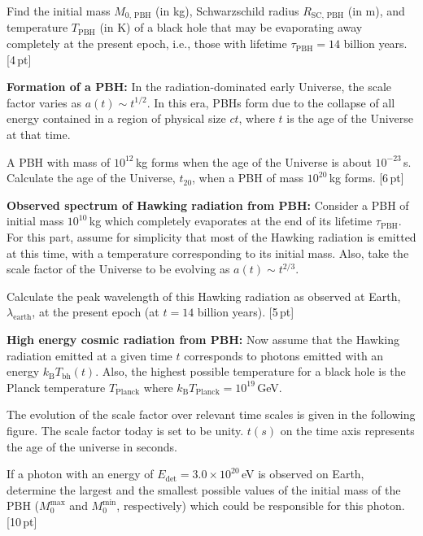 \begin{description}
\begin{description}
    Find the initial mass $M_{0,\,\mathrm{PBH}}$ (in kg), Schwarzschild radius
    $R_{\mathrm{SC},\,\mathrm{PBH}}$ (in m), and temperature
    $T_{\mathrm{PBH}}$ (in K) of a black hole that may be evaporating away
    completely at the present epoch, i.e., those with lifetime
    $\tau_{\mathrm{PBH}} = 14$ billion years. \hfill[4\,pt]
  \item[(T12.2b)] \textbf{Formation of a PBH:} In the radiation-dominated
    early Universe, the scale factor varies as $a(t) \sim t^{1/2}$. In this
    era, PBHs form due to the collapse of all energy contained in a region of
    physical size $ct$, where $t$ is the age of the Universe at that time.

    A PBH with mass of $10^{12}$\,kg forms when the age of the Universe is
    about $10^{-23}$\,s. Calculate the age of the Universe, $t_{20}$, when a
    PBH of mass $10^{20}$\,kg forms. \hfill[6\,pt]
  \item[(T12.2c)] \textbf{Observed spectrum of Hawking radiation from PBH:}
    Consider a PBH of initial mass $10^{10}$\,kg which completely evaporates
    at the end of its lifetime $\tau_{\mathrm{PBH}}$. For this part, assume
    for simplicity that most of the Hawking radiation is emitted at this time,
    with a temperature corresponding to its initial mass. Also, take the scale
    factor of the Universe to be evolving as $a(t) \sim t^{2/3}$.

    Calculate the peak wavelength of this Hawking radiation as observed at
    Earth, $\lambda_{\mathrm{earth}}$, at the present epoch (at $t = 14$
    billion years). \hfill[5\,pt]
  \item[(T12.2d)] \textbf{High energy cosmic radiation from PBH:} Now assume
    that the Hawking radiation emitted at a given time $t$ corresponds to
    photons emitted with an energy $k_{\mathrm{B}}T_{\mathrm{bh}}(t)$. Also,
    the highest possible temperature for a black hole is the Planck
    temperature $T_{\mathrm{Planck}}$ where
    $k_{\mathrm{B}}T_{\mathrm{Planck}} = 10^{19}$\,GeV.

    The evolution of the scale factor over relevant time scales is given in
    the following figure. The scale factor today is set to be unity. $t(s)$ on
    the time axis represents the age of the universe in seconds.

    If a photon with an energy of $E_{\mathrm{det}} = 3.0 \times 10^{20}$\,eV
    is observed on Earth, determine the largest and the smallest possible
    values of the initial mass of the PBH ($M_0^{\mathrm{max}}$ and
    $M_0^{\mathrm{min}}$, respectively) which could be responsible for this
    photon. \hfill[10\,pt]
  \end{description}
\end{description}

